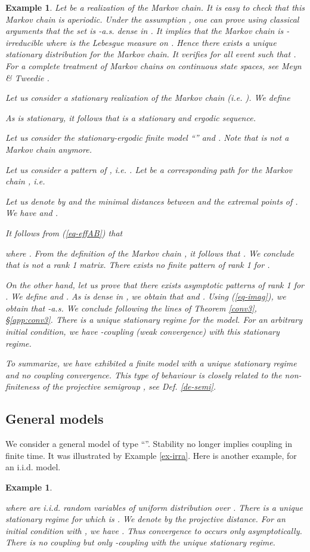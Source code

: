 \documentclass[11pt,titlepage]{article}
\def\eref#1{(\ref{#1})}
\newcommand{\parag}{\medskip\noindent}
\newtheorem{example}[theo]{Example }
\newenvironment{exam}{\begin{example}\rm}{\end{example}}
\begin{document}
\begin{exam}
Let  be a realization of the Markov chain.
It is easy to check that this Markov chain is aperiodic.
Under the assumption , one can prove using
classical arguments that the set  is -a.s. 
dense in . It implies that the Markov chain is
-irreducible where
 is the Lebesgue measure on . 
Hence there exists a unique 
stationary distribution   for the Markov chain.
It verifies  for all event  such that . 
For a complete treatment of Markov chains on continuous state spaces,
see Meyn \& Tweedie \cite{MeTw}.

Let us consider a 
stationary realization  of the Markov chain (i.e. 
). 
We define

As  is stationary, it follows that  is a 
stationary and ergodic sequence. 

\parag
Let us consider the stationary-ergodic finite model ``''
and . Note that  is not 
a Markov chain anymore. 


Let us consider a pattern  of , i.e.
. Let  be
a corresponding path for the Markov chain , i.e.

Let us denote by  and  the 
minimal distances 
between  and the extremal points of .
We have
 and 
.

It follows from \eref{eq-effAB} that 

where 
. 
From the definition of the Markov chain , it follows that
. We conclude that  is not a 
rank 1 matrix. There exists no finite pattern of rank 1 for . 

\parag
On the other hand,  let us prove that there exists  asymptotic
patterns of rank 1 for . We define
 and 
. 
As  is dense in , we obtain that
 and . 
Using
\eref{eq-imag}, we obtain that
 -a.s.
We conclude following the lines of Theorem \ref{conv3}, \S \ref{app:conv3}. 
There is a unique 
stationary regime for the model. For an arbitrary 
initial condition,  we have -coupling (weak convergence) with this
stationary regime.

\parag
To summarize, we have exhibited a finite model with a unique 
stationary regime and no coupling convergence. 
This type of behaviour is closely related to the 
non-finiteness of the projective semigroup , see Def. \ref{de-semi}.
\end{exam}

\subsection{General models}
We consider  a general model of type ``''.
Stability no longer implies coupling in finite time.
It was illustrated by Example \ref{ex-irra}. Here is another example, for
an i.i.d. model.
\begin{exam}
\label{ex:erg2}

where  are i.i.d. random variables of uniform distribution over
. There is a unique stationary 
regime for  which is . We denote by  the
projective distance. For an initial condition  with 
, we have .
Thus convergence to  occurs only asymptotically. 
There is no coupling but only 
-coupling with the unique stationary regime.
\end{exam}
\end{document}
